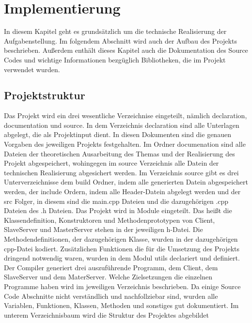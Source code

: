 \documentclass[a4paper,12pt]{article}
\begin{document}
\section{Implementierung}
In diesem Kapitel geht es grundsätzlich um die technische Realisierung der
Aufgabenstellung. Im folgendem Abschnitt wird auch der Aufbau des Projekts
beschrieben. Außerdem enthält dieses Kapitel auch die Dokumentation
des Source Codes und wichtige Informationen bezgüglich Bibliotheken, die
im Projekt verwendet wurden.
\subsection{Projektstruktur}
Das Projekt wird ein drei wesentliche Verzeichnise eingeteilt, nämlich declaration, documentation und source. In dem Verzeichnis declaration sind alle Unterlagen abgelegt, die als Projektinput dient. In diesen Dokumenten sind die genauen Vorgaben des jeweiligen Projekts festgehalten. Im Ordner documenation sind alle Dateien der theoretischen Ausarbeitung des Themas und der Realisierung des Projekt abgespeichert, wohingegen im source Verzeichnis alle Datein der technischen Realisierung abgesichert werden.
Im Verzeichnis source gibt es drei Unterverzeichnisse dem build Ordner, indem alle generierten Datein abgespeichert werden, der include Ordern, indem alle Header-Datein abgelegt werden und der src Folger, in diesem sind die main.cpp Dateien und die dazugehörigen .cpp Dateien des .h Dateien. Das Projekt wird in Module eingeteilt. Das heißt die Klassendefinition,
Konstruktoren und Methodenprototypen von Client, SlaveServer und MasterServer stehen in der jeweiligen h-Datei.
Die Methodendefinitionen, der dazugehörigen Klasse, wurden in der dazugehörigen cpp-Datei kodiert.
Zusätzlichen Funktionen die für die Umsetzung des Projekts dringend notwendig
waren, wurden in dem Modul utils declariert und definiert. 
Der Compiler generiert drei auszuführende Programm, dem Client, dem SlaveServer und dem MaterServer. Welche Zielsetzungen die einzelnen Programme haben wird im jeweiligen Verzeichnis beschrieben.
Da einige Source Code Abschnitte nicht verständlich und nachfollziebar sind, wurden
alle Variablen, Funktionen, Klassen, Methoden und sonstiges gut dokumentiert.
\newpage
Im unterem Verzeichnisbaum wird die Struktur des Projektes abgebildet
\\
\newpage
\noindent
\end{document}
